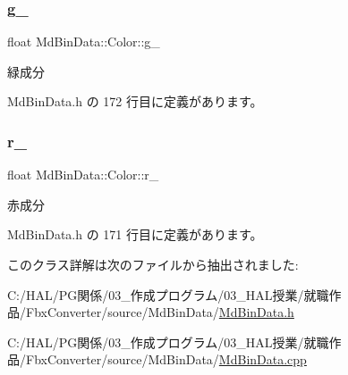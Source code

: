 \subsubsection{\texorpdfstring{g\+\_\+}{g\_}}
{\footnotesize\ttfamily float Md\+Bin\+Data\+::\+Color\+::g\+\_\+\hspace{0.3cm}{\ttfamily [private]}}



緑成分 



 Md\+Bin\+Data.\+h の 172 行目に定義があります。

\mbox{\label{class_md_bin_data_1_1_color_a86af984afebeabe57f5155c1981d9c94}} 
\subsubsection{\texorpdfstring{r\+\_\+}{r\_}}
{\footnotesize\ttfamily float Md\+Bin\+Data\+::\+Color\+::r\+\_\+\hspace{0.3cm}{\ttfamily [private]}}



赤成分 



 Md\+Bin\+Data.\+h の 171 行目に定義があります。



このクラス詳解は次のファイルから抽出されました\+:\begin{DoxyCompactItemize}
\item 
C\+:/\+H\+A\+L/\+P\+G関係/03\+\_\+作成プログラム/03\+\_\+\+H\+A\+L授業/就職作品/\+Fbx\+Converter/source/\+Md\+Bin\+Data/\mbox{\hyperlink{_md_bin_data_8h}{Md\+Bin\+Data.\+h}}\item 
C\+:/\+H\+A\+L/\+P\+G関係/03\+\_\+作成プログラム/03\+\_\+\+H\+A\+L授業/就職作品/\+Fbx\+Converter/source/\+Md\+Bin\+Data/\mbox{\hyperlink{_md_bin_data_8cpp}{Md\+Bin\+Data.\+cpp}}\end{DoxyCompactItemize}
